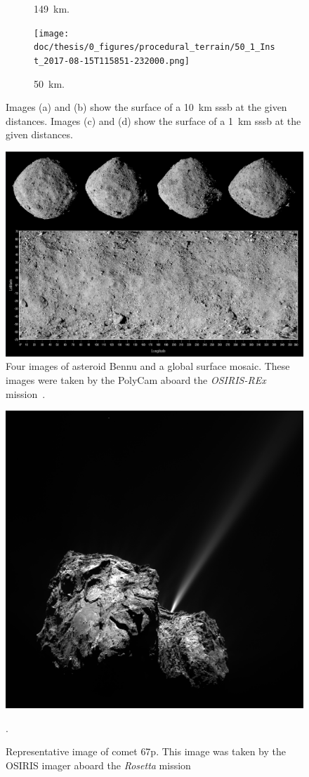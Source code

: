 \begin{figure}[htb]
\begin{subfigure}[b]{0.48\textwidth}
        \caption{\SI{149}{\kilo\meter}.}
        \label{fig:render_quali_comparison_3}
    \end{subfigure}
    \begin{subfigure}[b]{0.48\textwidth}
        \centering
        \texttt{[image: doc/thesis/0\_figures/procedural\_terrain/50\_1\_Inst\_2017-08-15T115851-232000.png]}
        \caption{\SI{50}{\kilo\meter}.}
        \label{fig:render_quali_comparison_4}
    \end{subfigure}
    \caption{Images (a) and (b) show the surface of a \SI{10}{\kilo\meter} \gls{sssb} at the given distances. Images (c) and (d) show the surface of a \SI{1}{\kilo\meter} \gls{sssb} at the given distances.}
    \label{fig:render_quali_comparison}
\end{figure}

\begin{figure}[htb]
    \centering
    \includegraphics[width=.5\textwidth]{doc/thesis/0_figures/procedural_terrain/2963_Bennu.png}
    \caption{Four images of asteroid Bennu and a global surface mosaic. These images were taken by the PolyCam aboard the \textit{OSIRIS-REx} mission~\cite{FourExploration}.}
    \label{fig:render_quali_bennu}
\end{figure}

\begin{figure}[htb]
    \centering
    \includegraphics[width=.5\textwidth]{doc/thesis/0_figures/procedural_terrain/67P_CG.PNG}
    \caption{Representative image of comet \acrlong{67p}. This image was taken by the OSIRIS imager aboard the \textit{Rosetta} mission~\cite{OSIRISArchiveb}}.
    \label{fig:render_quali_67p}
\end{figure}

